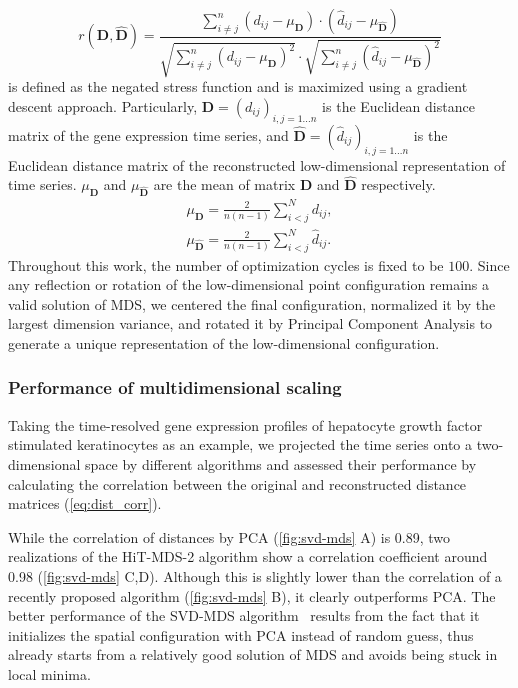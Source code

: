 \begin{equation}
  r(\boldsymbol{D}, \hat{\boldsymbol{D}}) = \frac{\sum_{i \neq j}^n (d_{ij} - \mu_{\boldsymbol{D}}
    ) \cdot (\hat{d}_{ij} - 
    \mu_{\hat{\boldsymbol{D}}})}{\sqrt{\sum_{i \neq j}^n (d_{ij} - \mu_{\boldsymbol{D}})^2} 
    \cdot \sqrt{
    \sum_{i \neq j}^n (\hat{d}_{ij} - \mu_{\hat{\boldsymbol{D}}})^2}}
  \label{eq:dist_corr}
\end{equation}
is defined as the negated stress function and is maximized using a gradient descent approach.
Particularly, $\boldsymbol{D} = (d_{ij})_{i,j=1...n}$ is the 
Euclidean distance matrix of the
gene expression time series, and $\hat{\boldsymbol{D}} = (\hat{d}_{ij})_{i,j=1...n}$ 
is the 
Euclidean distance matrix of the reconstructed 
low-dimensional representation of time series. 
$\mu_{\boldsymbol{D}}$ and $\mu_{\hat{\boldsymbol{D}}}$ are the mean of matrix $\boldsymbol{D}$
and $\hat{\boldsymbol{D}}$ respectively.
\begin{eqnarray}
  \mu_{\boldsymbol{D}} = \frac{2}{n (n-1)} \sum_{i<j}^N d_{ij},\\
  \mu_{\hat{\boldsymbol{D}}} = \frac{2}{n (n-1)} \sum_{i<j}^N \hat{d}_{ij}.
\end{eqnarray}
Throughout this work, the number of optimization cycles is fixed to be $100$.
Since any reflection or rotation of the low-dimensional point configuration
remains a valid solution of MDS,
we centered the final configuration, normalized it by the largest dimension variance,
and rotated it by Principal Component Analysis to generate a unique 
representation of the low-dimensional configuration.

\subsubsection{Performance of multidimensional scaling}
Taking the time-resolved gene expression profiles of hepatocyte growth factor
stimulated keratinocytes as an example, we projected the time series onto a 
two-dimensional space by different algorithms and assessed their performance
by calculating the correlation between the original and reconstructed distance
matrices (\ref{eq:dist_corr}).

While the correlation of distances by PCA (\ref{fig:svd-mds} A) is 0.89, two 
realizations of the HiT-MDS-2 algorithm show a correlation coefficient around 
0.98 (\ref{fig:svd-mds} C,D). Although this is slightly lower than the correlation of a recently 
proposed algorithm (\ref{fig:svd-mds} B), it clearly outperforms PCA. The 
better performance of the SVD-MDS algorithm~\citep{Becavin2011} results from
the fact that it initializes the spatial configuration with PCA instead of 
random guess, thus already starts from a relatively good solution of MDS and
avoids being stuck in local minima.

